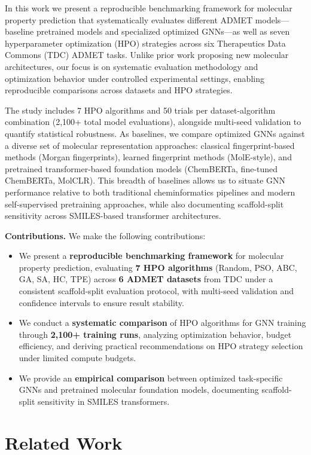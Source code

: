 \documentclass[12pt]{article}
\begin{document}
In this work we present a reproducible benchmarking framework for molecular property prediction that systematically evaluates different ADMET models---baseline pretrained models and specialized optimized GNNs---as well as seven hyperparameter optimization (HPO) strategies across six Therapeutics Data Commons (TDC) ADMET tasks. Unlike prior work proposing new molecular architectures, our focus is on systematic evaluation methodology and optimization behavior under controlled experimental settings, enabling reproducible comparisons across datasets and HPO strategies.

The study includes 7 HPO algorithms and 50 trials per dataset-algorithm combination (2,100+ total model evaluations), alongside multi-seed validation to quantify statistical robustness. As baselines, we compare optimized GNNs against a diverse set of molecular representation approaches: classical fingerprint-based methods (Morgan fingerprints), learned fingerprint methods (MolE-style), and pretrained transformer-based foundation models (ChemBERTa, fine-tuned ChemBERTa, MolCLR).
This breadth of baselines allows us to situate GNN performance relative to both traditional cheminformatics pipelines and modern self-supervised pretraining approaches, while also documenting scaffold-split sensitivity across SMILES-based transformer architectures.

\noindent\textbf{Contributions.} We make the following contributions:
\begin{itemize}
    \item We present a \textbf{reproducible benchmarking framework} for molecular property prediction, evaluating \textbf{7 HPO algorithms} (Random, PSO, ABC, GA, SA, HC, TPE) across \textbf{6 ADMET datasets} from TDC under a consistent scaffold-split evaluation protocol, with multi-seed validation and confidence intervals to ensure result stability.
    \item We conduct a \textbf{systematic comparison} of HPO algorithms for GNN training through \textbf{2,100+ training runs}, analyzing optimization behavior, budget efficiency, and deriving practical recommendations on HPO strategy selection under limited compute budgets.
    \item We provide an \textbf{empirical comparison} between optimized task-specific GNNs and pretrained molecular foundation models, documenting scaffold-split sensitivity in SMILES transformers.
\end{itemize}

\section{Related Work}
\end{document}
